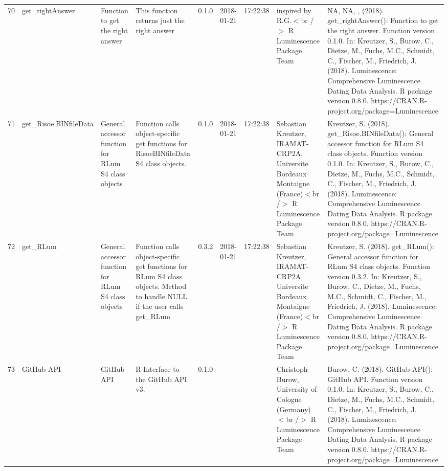\begin{table}[ht]
\begin{tabular}{rllllllll}
 \\ 
  70 & get\_rightAnswer & Function to get the right answer & This function returns just the right answer & 0.1.0 & 2018-01-21 & 17:22:38
 & inspired by R.G.$<$br /$>$  R Luminescence Package Team & NA, NA, ,  (2018). get\_rightAnswer(): Function to get the right answer. Function version 0.1.0. In: Kreutzer, S., Burow, C., Dietze, M., Fuchs, M.C., Schmidt, C., Fischer, M., Friedrich, J. (2018). Luminescence: Comprehensive Luminescence Dating Data Analysis. R package version 0.8.0. https://CRAN.R-project.org/package=Luminescence
 \\ 
  71 & get\_Risoe.BINfileData & General accessor function for RLum S4 class objects & Function calls object-specific get functions for RisoeBINfileData S4 class objects. & 0.1.0 & 2018-01-21 & 17:22:38
 & Sebastian Kreutzer, IRAMAT-CRP2A, Universite Bordeaux Montaigne (France)$<$br /$>$  R Luminescence Package Team & Kreutzer, S. (2018). get\_Risoe.BINfileData(): General accessor function for RLum S4 class objects. Function version 0.1.0. In: Kreutzer, S., Burow, C., Dietze, M., Fuchs, M.C., Schmidt, C., Fischer, M., Friedrich, J. (2018). Luminescence: Comprehensive Luminescence Dating Data Analysis. R package version 0.8.0. https://CRAN.R-project.org/package=Luminescence
 \\ 
  72 & get\_RLum & General accessor function for RLum S4 class objects & Function calls object-specific get functions for RLum S4 class objects.  Method to handle NULL if the user calls get\_RLum & 0.3.2 & 2018-01-21 & 17:22:38
 & Sebastian Kreutzer, IRAMAT-CRP2A, Universite Bordeaux Montaigne (France)$<$br /$>$  R Luminescence Package Team & Kreutzer, S. (2018). get\_RLum(): General accessor function for RLum S4 class objects. Function version 0.3.2. In: Kreutzer, S., Burow, C., Dietze, M., Fuchs, M.C., Schmidt, C., Fischer, M., Friedrich, J. (2018). Luminescence: Comprehensive Luminescence Dating Data Analysis. R package version 0.8.0. https://CRAN.R-project.org/package=Luminescence
 \\ 
  73 & GitHub-API & GitHub API & R Interface to the GitHub API v3. & 0.1.0
 &  &  & Christoph Burow, University of Cologne (Germany)$<$br /$>$  R Luminescence Package Team & Burow, C. (2018). GitHub-API(): GitHub API. Function version 0.1.0. In: Kreutzer, S., Burow, C., Dietze, M., Fuchs, M.C., Schmidt, C., Fischer, M., Friedrich, J. (2018). Luminescence: Comprehensive Luminescence Dating Data Analysis. R package version 0.8.0. https://CRAN.R-project.org/package=Luminescence
 \\ 

\end{tabular}
\end{table}
